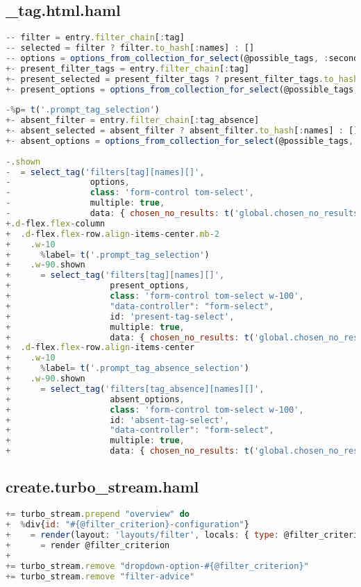 \subsection{\_tag.html.haml}
\begin{lstlisting}[language=JavaScript]
-- filter = entry.filter_chain[:tag]
-- selected = filter ? filter.to_hash[:names] : []
-- options = options_from_collection_for_select(@possible_tags, :second, :first, selected)
+- present_filter_tags = entry.filter_chain[:tag]
+- present_selected = present_filter_tags ? present_filter_tags.to_hash[:names] : []
+- present_options = options_from_collection_for_select(@possible_tags, :second, :first, present_selected)
 
-%p= t('.prompt_tag_selection')
+- absent_filter = entry.filter_chain[:tag_absence]
+- absent_selected = absent_filter ? absent_filter.to_hash[:names] : []
+- absent_options = options_from_collection_for_select(@possible_tags, :second, :first, absent_selected)
 
-.shown
-  = select_tag('filters[tag][names][]',
-                options,
-                class: 'form-control tom-select',
-                multiple: true,
-                data: { chosen_no_results: t('global.chosen_no_results'), placeholder: t('.prompt_tag_placeholder') } )
+.d-flex.flex-column
+  .d-flex.flex-row.align-items-center.mb-2
+    .w-10
+      %label= t('.prompt_tag_selection')
+    .w-90.shown
+      = select_tag('filters[tag][names][]',
+                    present_options,
+                    class: 'form-control tom-select w-100',
+                    "data-controller": "form-select",
+                    id: 'present-tag-select',
+                    multiple: true,
+                    data: { chosen_no_results: t('global.chosen_no_results'), placeholder: t('.prompt_tag_placeholder') } )
+  .d-flex.flex-row.align-items-center
+    .w-10
+      %label= t('.prompt_tag_absence_selection')
+    .w-90.shown
+      = select_tag('filters[tag_absence][names][]',
+                    absent_options,
+                    class: 'form-control tom-select w-100',
+                    id: 'absent-tag-select',
+                    "data-controller": "form-select",
+                    multiple: true,
+                    data: { chosen_no_results: t('global.chosen_no_results'), placeholder: t('.prompt_tag_placeholder') } )
\end{lstlisting}

\newpage

\subsection{create.turbo\_stream.haml}
\begin{lstlisting}[language=JavaScript]
+= turbo_stream.prepend "overview" do
+  %div{id: "#{@filter_criterion}-configuration"}
+    = render(layout: 'layouts/filter', locals: { type: @filter_criterion.to_sym, delete: true}) do
+      = render @filter_criterion
+
+= turbo_stream.remove "dropdown-option-#{@filter_criterion}"
+= turbo_stream.remove "filter-advice"
\end{lstlisting}

